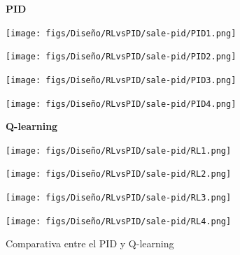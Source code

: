\begin{figure}[H]
  \centering

  \textbf{PID}
  \vspace{0.3cm}

  \begin{minipage}[t]{0.2\textwidth}
      \centering
      \texttt{[image: figs/Diseño/RLvsPID/sale-pid/PID1.png]}
      \caption*{}
  \end{minipage}
  \hfill
  \begin{minipage}[t]{0.2\textwidth}
      \centering
      \texttt{[image: figs/Diseño/RLvsPID/sale-pid/PID2.png]}
      \caption*{}
  \end{minipage}
  \hfill
  \begin{minipage}[t]{0.2\textwidth}
      \centering
      \texttt{[image: figs/Diseño/RLvsPID/sale-pid/PID3.png]}
      \caption*{}
  \end{minipage}
  \hfill
  \begin{minipage}[t]{0.2\textwidth}
      \centering
      \texttt{[image: figs/Diseño/RLvsPID/sale-pid/PID4.png]}
      \caption*{}
  \end{minipage}
  \vspace{0.5cm}

  \textbf{Q-learning}
  \vspace{0.3cm}

  \begin{minipage}[t]{0.2\textwidth}
      \centering
      \texttt{[image: figs/Diseño/RLvsPID/sale-pid/RL1.png]}
      \caption*{}
  \end{minipage}
  \hfill
  \begin{minipage}[t]{0.2\textwidth}
      \centering
      \texttt{[image: figs/Diseño/RLvsPID/sale-pid/RL2.png]}
      \caption*{}
  \end{minipage}
  \hfill
  \begin{minipage}[t]{0.2\textwidth}
      \centering
      \texttt{[image: figs/Diseño/RLvsPID/sale-pid/RL3.png]}
      \caption*{}
  \end{minipage}
  \hfill
  \begin{minipage}[t]{0.2\textwidth}
      \centering
      \texttt{[image: figs/Diseño/RLvsPID/sale-pid/RL4.png]}
      \caption*{}
  \end{minipage}
  \caption{Comparativa entre el PID y Q-learning}
  \label{comparativa-PID-qlearning}
\end{figure}


  

